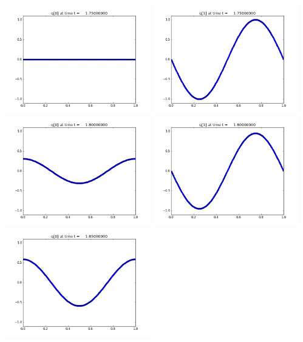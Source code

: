 \documentclass[11pt]{article}
\begin{document}
\vskip 10pt 
\includegraphics[width=0.475\textwidth]{frame0035fig0.png}
\includegraphics[width=0.475\textwidth]{frame0035fig1.png}
\vskip 10pt 
\includegraphics[width=0.475\textwidth]{frame0036fig0.png}
\includegraphics[width=0.475\textwidth]{frame0036fig1.png}
\vskip 10pt 
\includegraphics[width=0.475\textwidth]{frame0037fig0.png}
\end{document}
